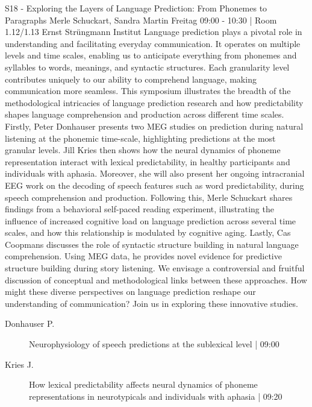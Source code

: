 
            \begin{symposium}
            {S18 - Exploring the Layers of Language Prediction: From Phonemes to Paragraphs}
            {Merle Schuckart, Sandra Martin}
            {Freitag 09:00 - 10:30 | Room 1.12/1.13}
            { Ernst Strüngmann Institut}
            Language prediction plays a pivotal role in understanding and facilitating everyday communication. It operates on multiple levels and time scales, enabling us to anticipate everything from phonemes and syllables to words, meanings, and syntactic structures. Each granularity level contributes uniquely to our ability to comprehend language, making communication more seamless. This symposium illustrates the breadth of the methodological intricacies of language prediction research and how predictability shapes language comprehension and production across different time scales.
Firstly, Peter Donhauser presents two MEG studies on prediction during natural listening at the phonemic time-scale, highlighting predictions at the most granular levels. Jill Kries then shows how the neural dynamics of phoneme representation interact with lexical predictability, in healthy participants and individuals with aphasia. Moreover, she will also present her ongoing intracranial EEG work on the decoding of speech features such as word predictability, during speech comprehension and production. Following this, Merle Schuckart shares findings from a behavioral self-paced reading experiment, illustrating the influence of increased cognitive load on language prediction across several time scales, and how this relationship is modulated by cognitive aging. Lastly, Cas Coopmans discusses the role of syntactic structure building in natural language comprehension. Using MEG data, he provides novel evidence for predictive structure building during story listening.
We envisage a controversial and fruitful discussion of conceptual and methodological links between these approaches. How might these diverse perspectives on language prediction reshape our understanding of communication? Join us in exploring these innovative studies.
            \begin{description}    
            
                \item [ Donhauser P.] Neurophysiology of speech predictions at the sublexical level \textcolor{mygray}{ | 09:00}    
                
                \item [ Kries J.] How lexical predictability affects neural dynamics of phoneme representations in neurotypicals and individuals with aphasia \textcolor{mygray}{ | 09:20}    
                

\end{description}
\end{symposium}
